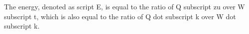 The energy, denoted as script E, is equal to the ratio of Q subscript zu over W subscript t, which is also equal to the ratio of Q dot subscript k over W dot subscript k.
